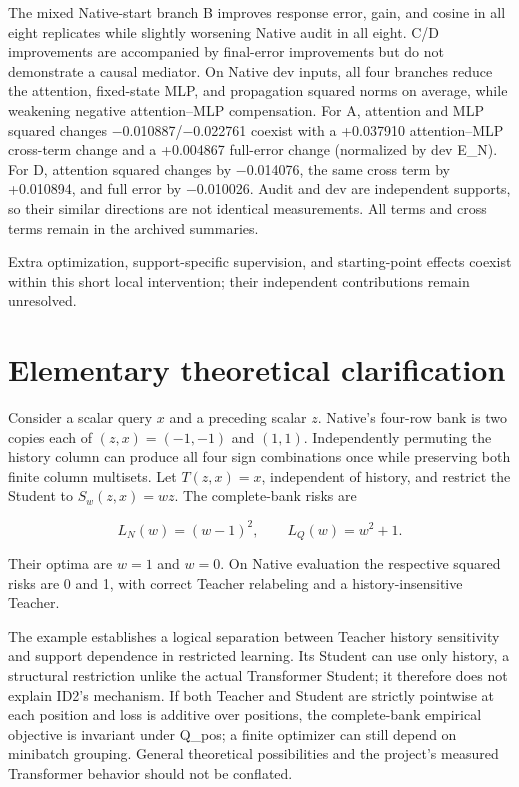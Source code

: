 The mixed Native-start branch B improves response error, gain, and cosine in all eight replicates while slightly worsening Native audit in all eight. C/D improvements are accompanied by final-error improvements but do not demonstrate a causal mediator. On Native dev inputs, all four branches reduce the attention, fixed-state MLP, and propagation squared norms on average, while weakening negative attention--MLP compensation. For A, attention and MLP squared changes \(-\)0.010887/\(-\)0.022761 coexist with a +0.037910 attention--MLP cross-term change and a +0.004867 full-error change (normalized by dev E\_N). For D, attention squared changes by \(-\)0.014076, the same cross term by +0.010894, and full error by \(-\)0.010026. Audit and dev are independent supports, so their similar directions are not identical measurements. All terms and cross terms remain in the archived summaries.

Extra optimization, support-specific supervision, and starting-point effects coexist within this short local intervention; their independent contributions remain unresolved.

\section{Elementary theoretical clarification}\label{elementary-theoretical-clarification}

Consider a scalar query \(x\) and a preceding scalar \(z\). Native's four-row bank is two copies each of \((z,x)=(-1,-1)\) and \((1,1)\). Independently permuting the history column can produce all four sign combinations once while preserving both finite column multisets. Let \(T(z,x)=x\), independent of history, and restrict the Student to \(S_w(z,x)=wz\). The complete-bank risks are

\[L_N(w)=(w-1)^2,\qquad L_Q(w)=w^2+1.\]

Their optima are \(w=1\) and \(w=0\). On Native evaluation the respective squared risks are 0 and 1, with correct Teacher relabeling and a history-insensitive Teacher.

The example establishes a logical separation between Teacher history sensitivity and support dependence in restricted learning. Its Student can use only history, a structural restriction unlike the actual Transformer Student; it therefore does not explain ID2's mechanism. If both Teacher and Student are strictly pointwise at each position and loss is additive over positions, the complete-bank empirical objective is invariant under Q\_pos; a finite optimizer can still depend on minibatch grouping. General theoretical possibilities and the project's measured Transformer behavior should not be conflated.
